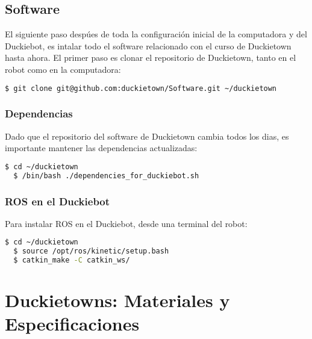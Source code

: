 \documentclass[12pt]{article}
\begin{document}

\subsection{Software} 

El siguiente paso despúes de toda la configuración inicial de la computadora y del Duckiebot, es intalar todo el software relacionado con el curso de Duckietown hasta ahora. El primer paso es clonar el repositorio de Duckietown, tanto en el robot como en la computadora:

\begin{lstlisting}[language=bash]
  $ git clone git@github.com:duckietown/Software.git ~/duckietown
\end{lstlisting}

\subsubsection{Dependencias}

Dado que el repositorio del software de Duckietown cambia todos los dias, es importante mantener las dependencias actualizadas:

\begin{lstlisting}[language=bash]
  $ cd ~/duckietown
  $ /bin/bash ./dependencies_for_duckiebot.sh
\end{lstlisting}

\subsubsection{ROS en el Duckiebot}

Para instalar ROS en el Duckiebot, desde una terminal del robot:

\begin{lstlisting}[language=bash]
  $ cd ~/duckietown
  $ source /opt/ros/kinetic/setup.bash
  $ catkin_make -C catkin_ws/
\end{lstlisting}

\section{Duckietowns: Materiales y Especificaciones}
\end{document}
